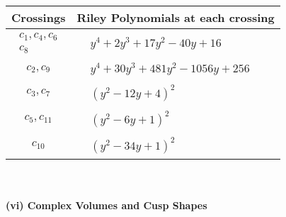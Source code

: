 \documentclass[1p]{elsarticle_modified}
\theoremstyle{definition}
\begin{document}
\begin{tabular}{m{50pt}|m{274pt}}
Crossings & \hspace{64pt}Riley Polynomials at each crossing \\
\hline $$\begin{aligned}c_{1},c_{4},c_{6}\\c_{8}\end{aligned}$$&$\begin{aligned}
&y^4+2 y^3+17 y^2-40 y+16
\end{aligned}$\\
\hline $$\begin{aligned}c_{2},c_{9}\end{aligned}$$&$\begin{aligned}
&y^4+30 y^3+481 y^2-1056 y+256
\end{aligned}$\\
\hline $$\begin{aligned}c_{3},c_{7}\end{aligned}$$&$\begin{aligned}
&(y^2-12 y+4)^2
\end{aligned}$\\
\hline $$\begin{aligned}c_{5},c_{11}\end{aligned}$$&$\begin{aligned}
&(y^2-6 y+1)^2
\end{aligned}$\\
\hline $$\begin{aligned}c_{10}\end{aligned}$$&$\begin{aligned}
&(y^2-34 y+1)^2
\end{aligned}$\\
\hline
\end{tabular}\\~\\
\newpage\flushleft \textbf{(vi) Complex Volumes and Cusp Shapes}
\end{document}
